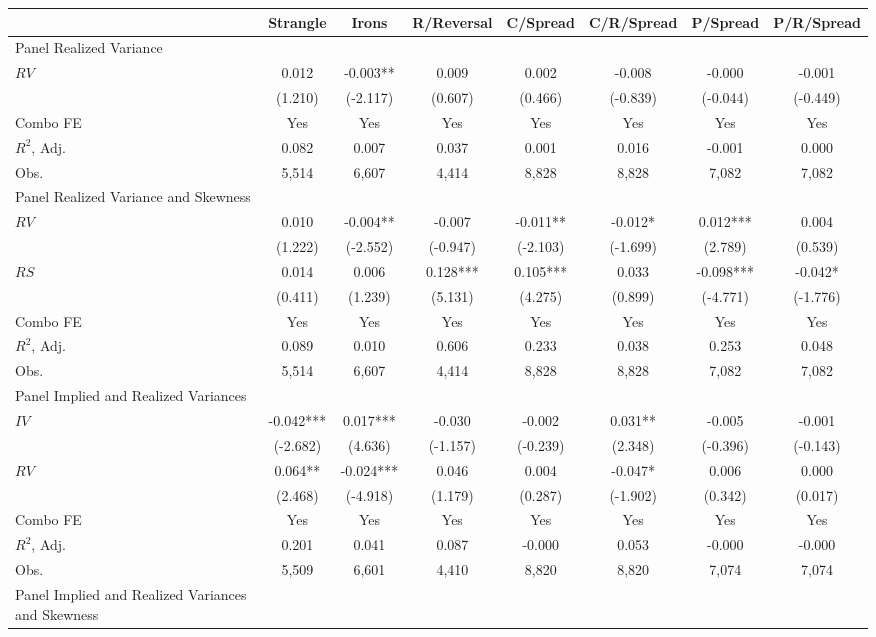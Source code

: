 \begin{tabular}{lccccccc}
\toprule
 & Strangle & Irons & R/Reversal & C/Spread & C/R/Spread & P/Spread & P/R/Spread \\
\midrule
Panel Realized Variance &  &  &  &  &  &  &  \\
$RV$ & 0.012 & -0.003** & 0.009 & 0.002 & -0.008 & -0.000 & -0.001 \\
 & (1.210) & (-2.117) & (0.607) & (0.466) & (-0.839) & (-0.044) & (-0.449) \\
Combo FE & Yes & Yes & Yes & Yes & Yes & Yes & Yes \\
$R^2$,  Adj. & 0.082 & 0.007 & 0.037 & 0.001 & 0.016 & -0.001 & 0.000 \\
Obs. & 5,514 & 6,607 & 4,414 & 8,828 & 8,828 & 7,082 & 7,082 \\
Panel Realized Variance and Skewness &  &  &  &  &  &  &  \\
$RV$ & 0.010 & -0.004** & -0.007 & -0.011** & -0.012* & 0.012*** & 0.004 \\
 & (1.222) & (-2.552) & (-0.947) & (-2.103) & (-1.699) & (2.789) & (0.539) \\
$RS$ & 0.014 & 0.006 & 0.128*** & 0.105*** & 0.033 & -0.098*** & -0.042* \\
 & (0.411) & (1.239) & (5.131) & (4.275) & (0.899) & (-4.771) & (-1.776) \\
Combo FE & Yes & Yes & Yes & Yes & Yes & Yes & Yes \\
$R^2$,  Adj. & 0.089 & 0.010 & 0.606 & 0.233 & 0.038 & 0.253 & 0.048 \\
Obs. & 5,514 & 6,607 & 4,414 & 8,828 & 8,828 & 7,082 & 7,082 \\
Panel Implied and Realized Variances &  &  &  &  &  &  &  \\
$IV$ & -0.042*** & 0.017*** & -0.030 & -0.002 & 0.031** & -0.005 & -0.001 \\
 & (-2.682) & (4.636) & (-1.157) & (-0.239) & (2.348) & (-0.396) & (-0.143) \\
$RV$ & 0.064** & -0.024*** & 0.046 & 0.004 & -0.047* & 0.006 & 0.000 \\
 & (2.468) & (-4.918) & (1.179) & (0.287) & (-1.902) & (0.342) & (0.017) \\
Combo FE & Yes & Yes & Yes & Yes & Yes & Yes & Yes \\
$R^2$,  Adj. & 0.201 & 0.041 & 0.087 & -0.000 & 0.053 & -0.000 & -0.000 \\
Obs. & 5,509 & 6,601 & 4,410 & 8,820 & 8,820 & 7,074 & 7,074 \\
Panel Implied and Realized Variances and Skewness &  &  &  &  &  &  &  \\

\end{tabular}
